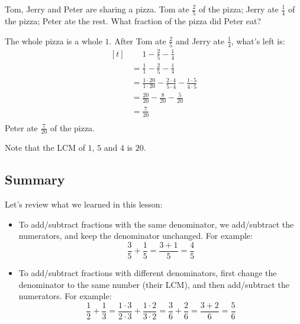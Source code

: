 \begin{myexample}
Tom, Jerry and Peter are sharing a pizza. Tom ate $\frac{2}{5}$ of the pizza; Jerry ate $\frac{1}{4}$ of the pizza; Peter ate the rest. What fraction of the pizza did Peter eat?
\end{myexample}
\begin{solution}
The whole pizza is a whole $1$. After Tom ate $\frac{2}{5}$ and Jerry ate $\frac{1}{4}$, what's left is:
\[ 
\begin{aligned}[t]
	&\phantom{{}=}1-\frac{2}{5}-\frac{1}{4} \\
	&=\frac{1}{1}-\frac{2}{5}-\frac{1}{4} \\
	&=\frac{1\cdot20}{1\cdot20}-\frac{2\cdot4}{5\cdot4}-\frac{1\cdot5}{4\cdot5} \\
	&=\frac{20}{20}-\frac{8}{20}-\frac{5}{20} \\
	&=\frac{7}{20} \\
\end{aligned}
\]
Peter ate $\frac{7}{20}$ of the pizza.

Note that the LCM of $1$, $5$ and $4$ is $20$.
\end{solution}

\subsection{Summary}
Let's review what we learned in this lesson:
\begin{itemize}
\item To add/subtract fractions with the same denominator, we add/subtract the numerators, and keep the denominator unchanged. For example: 
\[ \frac{3}{5}+\frac{1}{5}=\frac{3+1}{5}=\frac{4}{5} \]
\item To add/subtract fractions with different denominators, first change the denominator to the same number (their LCM), and then add/subtract the numerators. For example: 
\[ \frac{1}{2}+\frac{1}{3}=\frac{1\cdot3}{2\cdot3}+\frac{1\cdot2}{3\cdot2}=\frac{3}{6}+\frac{2}{6}=\frac{3+2}{6}=\frac{5}{6} \]
\end{itemize}

